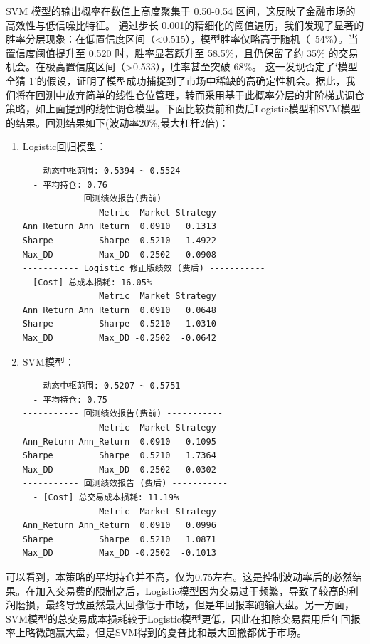 \documentclass[11pt, a4paper]{article}
\begin{document}
SVM 模型的输出概率在数值上高度聚集于 0.50-0.54 区间，这反映了金融市场的高效性与低信噪比特征。 通过步长 0.001的精细化的阈值遍历，我们发现了显著的胜率分层现象：在低置信度区间（<0.515），模型胜率仅略高于随机（~54\%）。当置信度阈值提升至 0.520 时，胜率显著跃升至 58.5\%，且仍保留了约 35\% 的交易机会。在极高置信度区间（>0.533），胜率甚至突破 68\%。 这一发现否定了‘模型全猜 1’的假设，证明了模型成功捕捉到了市场中稀缺的高确定性机会。据此，我们将在回测中放弃简单的线性仓位管理，转而采用基于此概率分层的非阶梯式调仓策略，如上面提到的线性调仓模型。下面比较费前和费后Logistic模型和SVM模型的结果。回测结果如下(波动率20\%,最大杠杆2倍)：
\begin{enumerate}
    \item Logistic回归模型：\begin{verbatim}
  - 动态中枢范围: 0.5394 ~ 0.5524 
  - 平均持仓: 0.76
----------- 回测绩效报告(费前) -----------
               Metric  Market Strategy
Ann_Return Ann_Return  0.0910   0.1313
Sharpe         Sharpe  0.5210   1.4922
Max_DD         Max_DD -0.2502  -0.0908
----------- Logistic 修正版绩效 (费后) -----------
- [Cost] 总成本损耗: 16.05%
               Metric  Market Strategy        
Ann_Return Ann_Return  0.0910   0.0648        
Sharpe         Sharpe  0.5210   1.0310        
Max_DD         Max_DD -0.2502  -0.0642
    \end{verbatim}
    \item SVM模型：\begin{verbatim}
  - 动态中枢范围: 0.5207 ~ 0.5751 
  - 平均持仓: 0.75
----------- 回测绩效报告(费前) -----------
               Metric  Market Strategy        
Ann_Return Ann_Return  0.0910   0.1095        
Sharpe         Sharpe  0.5210   1.7364
Max_DD         Max_DD -0.2502  -0.0302
----------- 回测绩效报告 (费后) -----------
  - [Cost] 总交易成本损耗: 11.19%
               Metric  Market Strategy
Ann_Return Ann_Return  0.0910   0.0996
Sharpe         Sharpe  0.5210   1.0871
Max_DD         Max_DD -0.2502  -0.1013
\end{verbatim}

\end{enumerate}
可以看到，本策略的平均持仓并不高，仅为0.75左右。这是控制波动率后的必然结果。在加入交易费的限制之后，Logistic模型因为交易过于频繁，导致了较高的利润磨损，最终导致虽然最大回撤低于市场，但是年回报率跑输大盘。另一方面，SVM模型的总交易成本损耗较于Logistic模型更低，因此在扣除交易费用后年回报率上略微跑赢大盘，但是SVM得到的夏普比和最大回撤都优于市场。
\end{document}
